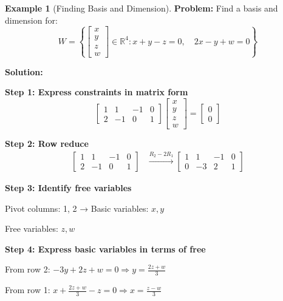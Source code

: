 \documentclass[12pt,a4paper]{article}
\theoremstyle{definition}
\newtheorem{example}{Example}[section]
\begin{document}
\begin{example}[Finding Basis and Dimension]
\textbf{Problem:} Find a basis and dimension for:
\begin{equation}
W = \left\{\begin{bmatrix} x \\ y \\ z \\ w \end{bmatrix} \in \mathbb{R}^4 : x + y - z = 0, \quad 2x - y + w = 0\right\}
\end{equation}

\textbf{Solution:}

\textbf{Step 1: Express constraints in matrix form}
\begin{equation}
\begin{bmatrix} 1 & 1 & -1 & 0 \\ 2 & -1 & 0 & 1 \end{bmatrix} \begin{bmatrix} x \\ y \\ z \\ w \end{bmatrix} = \begin{bmatrix} 0 \\ 0 \end{bmatrix}
\end{equation}

\textbf{Step 2: Row reduce}
\begin{align}
\begin{bmatrix} 1 & 1 & -1 & 0 \\ 2 & -1 & 0 & 1 \end{bmatrix} &\xrightarrow{R_2 - 2R_1} \begin{bmatrix} 1 & 1 & -1 & 0 \\ 0 & -3 & 2 & 1 \end{bmatrix}
\end{align}

\textbf{Step 3: Identify free variables}

Pivot columns: 1, 2 → Basic variables: $x, y$

Free variables: $z, w$

\textbf{Step 4: Express basic variables in terms of free}

From row 2: $-3y + 2z + w = 0 \Rightarrow y = \frac{2z + w}{3}$

From row 1: $x + \frac{2z + w}{3} - z = 0 \Rightarrow x = \frac{z - w}{3}$


\end{example}
\end{document}
